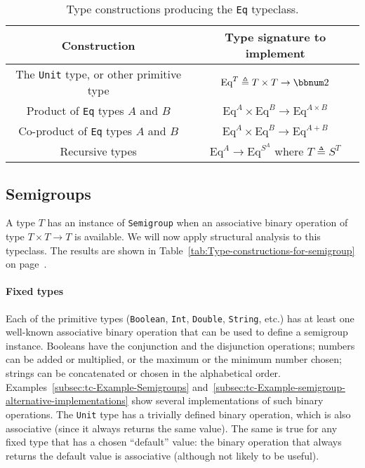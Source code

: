 \begin{table}
\begin{centering}
\begin{tabular}{|c|c|}
\hline 
\textbf{\footnotesize{}Construction} & \textbf{\footnotesize{}Type signature to implement}\tabularnewline
\hline 
\hline 
{\footnotesize{}The }\lstinline!Unit!{\footnotesize{} type, or other
primitive type} & {\footnotesize{}$\text{Eq}^{T}\triangleq T\times T\rightarrow\bbnum 2$}\tabularnewline
\hline 
{\footnotesize{}Product of }\lstinline!Eq!{\footnotesize{} types
$A$ and $B$} & {\footnotesize{}$\text{Eq}^{A}\times\text{Eq}^{B}\rightarrow\text{Eq}^{A\times B}$}\tabularnewline
\hline 
{\footnotesize{}Co-product of }\lstinline!Eq!{\footnotesize{} types
$A$ and $B$} & {\footnotesize{}$\text{Eq}^{A}\times\text{Eq}^{B}\rightarrow\text{Eq}^{A+B}$}\tabularnewline
\hline 
{\footnotesize{}Recursive types} & {\footnotesize{}$\text{Eq}^{A}\rightarrow\text{Eq}^{S^{A}}$ where
$T\triangleq S^{T}$}\tabularnewline
\hline 
\end{tabular}
\par\end{centering}
\caption{Type constructions producing the \lstinline!Eq! typeclass.\label{tab:Type-constructions-for-Eq}}
\end{table}


\subsection{Semigroups\label{subsec:Semigroups-constructions}}

A type $T$ has an instance of \lstinline!Semigroup! when an associative
binary operation of type $T\times T\rightarrow T$ is available. We
will now apply structural analysis to this typeclass. The results
are shown in Table~\ref{tab:Type-constructions-for-semigroup} on
page~\pageref{tab:Type-constructions-for-semigroup}.

\paragraph{Fixed types}

Each of the primitive types (\lstinline!Boolean!, \lstinline!Int!,
\lstinline!Double!, \lstinline!String!, etc.) has at least one well-known
associative binary operation that can be used to define a semigroup
instance. Booleans have the conjunction and the disjunction operations;
numbers can be added or multiplied, or the maximum or the minimum
number chosen; strings can be concatenated or chosen in the alphabetical
order. Examples~\ref{subsec:tc-Example-Semigroups} and~\ref{subsec:tc-Example-semigroup-alternative-implementations}
show several implementations of such binary operations. The \lstinline!Unit!
type has a trivially defined binary operation, which is also associative
(since it always returns the same value). The same is true for any
fixed type that has a chosen \textsf{``}default\textsf{''} value: the binary operation
that always returns the default value is associative (although not
likely to be useful).

